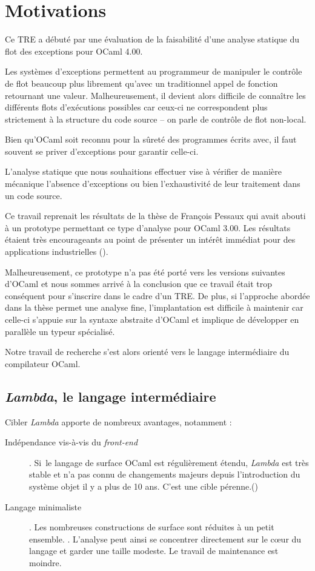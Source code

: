 \chapter{Motivations}

Ce TRE a débuté par une évaluation de la faisabilité d'une analyse statique du
flot des exceptions pour OCaml 4.00. 

Les systèmes d'exceptions permettent au programmeur de manipuler le contrôle de
flot beaucoup plus librement qu'avec un traditionnel appel de fonction
retournant une valeur. Malheureusement, il devient alors difficile de connaître
les différents flots d'exécutions possibles car ceux-ci ne correspondent plus
strictement à la structure du code source -- on parle de contrôle de flot
non-local.

Bien qu'OCaml soit reconnu pour la sûreté des programmes écrits avec, il faut
souvent se priver d'exceptions pour garantir celle-ci.

L'analyse statique que nous souhaitions effectuer vise à vérifier de manière
mécanique l'absence d'exceptions ou bien l'exhaustivité de leur traitement dans
un code source.

Ce travail reprenait les résultats de la thèse de François Pessaux  qui avait abouti à un prototype permettant ce type d'analyse pour OCaml
3.00.  Les résultats étaient très encourageants au point de présenter un
intérêt immédiat pour des applications industrielles ().

Malheureusement, ce prototype n'a pas été porté vers les versions suivantes
d'OCaml et nous sommes arrivé à la conclusion que ce travail était trop
conséquent pour s'inscrire dans le cadre d'un TRE.  De plus, si l'approche
abordée dans la thèse permet une analyse fine, l'implantation est difficile à
maintenir car celle-ci s'appuie sur la syntaxe abstraite d'OCaml et implique de
développer en parallèle un typeur spécialisé.

Notre travail de recherche s'est alors orienté vers le langage intermédiaire du
compilateur OCaml. 

\section{\emph{Lambda}, le langage intermédiaire}

Cibler \emph{Lambda} apporte de nombreux avantages, notamment :
\begin{description}
  \item[Indépendance vis-à-vis du \emph{front-end}]. Si le langage de surface
    OCaml est régulièrement étendu, \emph{Lambda} est très stable et n'a pas
    connu de changements majeurs depuis l'introduction du système objet il y a
    plus de 10 ans. C'est une cible pérenne.()
  \item[Langage minimaliste].
    Les nombreuses constructions de surface sont réduites à un petit ensemble.
    .
    L'analyse peut ainsi se concentrer directement sur le cœur du langage et
    garder une taille modeste. Le travail de maintenance est moindre.
\end{description}

